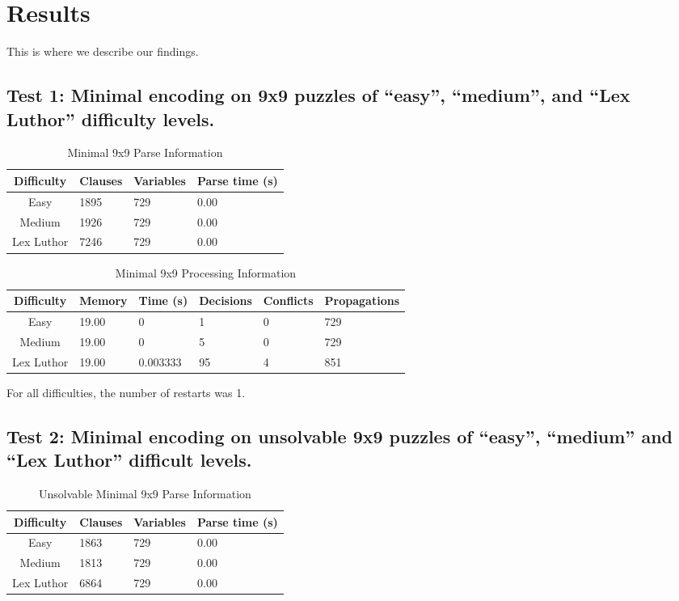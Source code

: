 \documentclass[conference,draftclsnofoot]{IEEEtran}
\begin{document}
\section{Results}
This is where we describe our findings.

\subsection{Test 1: Minimal encoding on 9x9 puzzles of ``easy'', ``medium'',
and ``Lex Luthor'' difficulty levels.}

\begin{table}[!h]
	\centering
	\begin{tabular}{c | l l l}
		Difficulty & Clauses & Variables & Parse time (s) \\\hline
		Easy 		& 1895 & 729 & 0.00 \\
		Medium 		& 1926 & 729 & 0.00 \\
		Lex Luthor 	& 7246 & 729 & 0.00
	\end{tabular}
	\caption{Minimal 9x9 Parse Information}
	\label{tab:summary}
\end{table}

\begin{table}[!h]
	\centering
	\begin{tabular}{c | l l p{20pt} p{20pt} l}
		Difficulty & Memory & Time (s) & Decisions &
		Conflicts & Propagations \\\hline
		Easy 		& 19.00 & 0 		& 1  & 0 & 729\\
		Medium 		& 19.00 & 0 		& 5  & 0 & 729\\
		Lex Luthor 	& 19.00 & 0.003333 	& 95 & 4 & 851
	\end{tabular}
	\caption{Minimal 9x9 Processing Information}

	\label{tab:summary}
	For all difficulties, the number of restarts was 1.
\end{table}

\subsection{Test 2: Minimal encoding on unsolvable 9x9 puzzles of ``easy'',
``medium'' and ``Lex Luthor'' difficult levels.}

\begin{table}[!h]
	\centering
	\begin{tabular}{c | l l l}
		Difficulty & Clauses & Variables & Parse time (s) \\\hline
		Easy 		& 1863 & 729 & 0.00 \\
		Medium 		& 1813 & 729 & 0.00 \\
		Lex Luthor 	& 6864 & 729 & 0.00
	\end{tabular}
	\caption{Unsolvable Minimal 9x9 Parse Information}

	\label{tab:summary}
\end{table}
\end{document}
